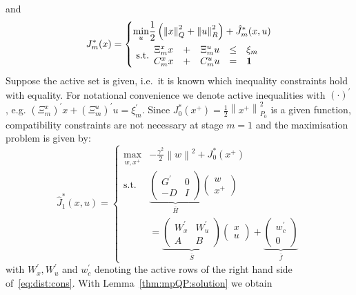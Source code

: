 \documentclass{ifacconf}
\providecommand{\norm}[1]{\left\|#1\right\|}
\begin{document}
and
\begin{equation}
	J_m^\ast(x) = \left\{\begin{split}
    \min_{u} & \frac{1}{2}\left(\norm{x}^2_Q + \norm{u}_R^2\right) + \hat J_m^\ast(x,u)\\
    \text{s.t.} & \begin{array}{ccccl}
    \Xi^x_m x &+& \Xi^u_m u &\leq &\xi_m\\
    C_m^x x &+ & C^u_m u & = & {\bf{1}}
    \end{array}
    \end{split}
    \right.
\end{equation}
Suppose the active set is given, i.e.~it is known which inequality constraints hold with equality. 
For notational convenience we denote active inequalities with $(\cdot)^\prime$, e.g.  $(\Xi^x_m)^\prime x + (\Xi^u_m)^\prime u = \xi_m^\prime$. 
Since $J^\ast_0(x^+) = \frac{1}{2}\norm{x^+}_{P_0}^2$ is a given function, compatibility constraints are not necessary at 
stage $m=1$ and the maximisation problem is given by:
\begin{equation}
	\hat J_1^\ast(x,u) = \left\{\begin{split}
	\max_{w,x^+} & -\frac{\gamma^2}{2}\norm{w}^2 + J_{0}^\ast(x^+)\\
	\text{s.t.} & 
	\underbrace{\left(\begin{array}{cc}
	G^\prime & 0 \\ -D & I
	\end{array}\right)}_{\bar H}
	\left(\begin{array}{c}w\\ x^+\end{array}\right)
	\\&= \underbrace{\left(\begin{array}{cc}W_x^\prime & W_u^\prime \\ A & B\end{array}\right)}_{
	\bar S
	}
	\left(\begin{array}{c}x \\ u \end{array}\right) + \underbrace{\left(\begin{array}{c}
	w_c^\prime \\ 0\end{array}\right)}_{\bar f}
	\end{split}\right.
\end{equation}
with $W_x^\prime, W_u^\prime$ and $w_c^\prime$ denoting the active rows of the right hand side 
of~\eqref{eq:dist:cons}.
With Lemma~\ref{thm:mpQP:solution} we obtain
\end{document}
